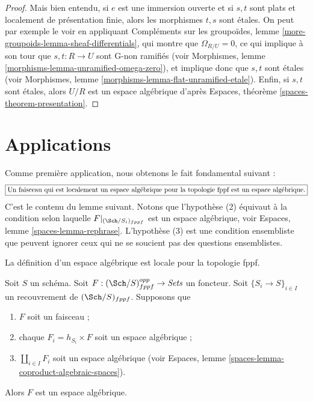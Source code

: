\begin{proof}
\medskip\noindent
Mais bien entendu, si $e$ est une immersion ouverte et si
$s, t$ sont plats et localement de présentation finie,
alors les morphismes $t, s$ sont étales.
On peut par exemple le voir en appliquant
Compléments sur les groupoïdes, lemme \ref{more-groupoids-lemma-sheaf-differentials},
qui montre que $\Omega_{R/U} = 0$, ce qui implique à son tour
que $s, t : R \to U$ sont G-non ramifiés (voir
Morphismes, lemme \ref{morphisms-lemma-unramified-omega-zero}),
et implique donc que $s, t$ sont étales (voir
Morphismes, lemme \ref{morphisms-lemma-flat-unramified-etale}).
Enfin, si $s, t$ sont étales, alors $U/R$ est un espace
algébrique d'après
Espaces, théorème \ref{spaces-theorem-presentation}.
\end{proof}





\section{Applications}
\label{section-applications}

\noindent
Comme première application, nous obtenons le fait fondamental suivant :
$$
\fbox{Un faisceau qui est localement un espace algébrique pour la topologie fppf est un espace algébrique.}
$$
C'est le contenu du lemme suivant.
Notons que l'hypothèse (2) équivaut à la condition selon laquelle
$F|_{(\Sch/S_i)_{fppf}}$ est un espace algébrique, voir
Espaces, lemme \ref{spaces-lemma-rephrase}.
L'hypothèse (3) est une condition ensembliste que peuvent ignorer
ceux qui ne se soucient pas des questions ensemblistes.

\begin{lemma}
\label{lemma-locally-algebraic-space}
\begin{slogan}
La définition d'un espace algébrique est locale pour la topologie fppf.
\end{slogan}
Soit $S$ un schéma.
Soit $F : (\Sch/S)_{fppf}^{opp} \to \textit{Sets}$ un foncteur.
Soit $\{S_i \to S\}_{i \in I}$ un recouvrement de $(\Sch/S)_{fppf}$.
Supposons que
\begin{enumerate}
\item $F$ soit un faisceau ;
\item chaque $F_i = h_{S_i} \times F$ soit un espace algébrique ;
\item $\coprod_{i \in I} F_i$ soit un espace algébrique (voir
Espaces, lemme \ref{spaces-lemma-coproduct-algebraic-spaces}).
\end{enumerate}
Alors $F$ est un espace algébrique.
\end{lemma}

